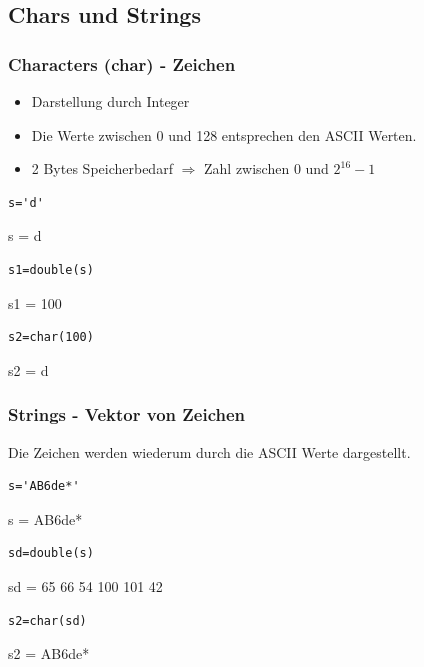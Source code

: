 \documentclass[hyperref={xetex}]{beamer}
\begin{document}
\subsection{Chars und Strings}
%
%
\begin{frame}[fragile]\frametitle{Characters (char) - Zeichen}
\begin{itemize}
 \item Darstellung durch Integer
 \item Die Werte zwischen 0 und 128 entsprechen den ASCII Werten. 
\item 2 Bytes Speicherbedarf $\Rightarrow$ Zahl zwischen 0 und $2^{16}-1$ 
\end{itemize}

\begin{lstlisting}
s='d'
\end{lstlisting}
\begin{matlab}
s = d
\end{matlab}
\begin{lstlisting}
s1=double(s)
\end{lstlisting}
\begin{matlab}
s1 =  100
\end{matlab}
\begin{lstlisting}
s2=char(100)
\end{lstlisting}
\begin{matlab}
s2 = d
\end{matlab}
\end{frame}
%
%
\begin{frame}[fragile]\frametitle{Strings - Vektor von Zeichen}
Die Zeichen werden wiederum durch die ASCII Werte dargestellt. 
\begin{lstlisting}
s='AB6de*'
\end{lstlisting}  
\begin{matlab}
s =
AB6de*
\end{matlab}
\begin{lstlisting}
sd=double(s)
\end{lstlisting}  
\begin{matlab}
sd =
    65    66    54   100   101    42
\end{matlab}
\begin{lstlisting}
s2=char(sd)
\end{lstlisting}  
\begin{matlab}
s2 =
AB6de*
\end{matlab}
\end{frame}
\end{document}
